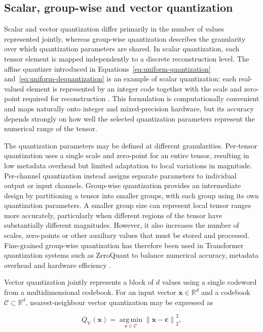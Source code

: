 \subsection{Scalar, group-wise and vector quantization}
Scalar and vector quantization differ primarily in the number of values
represented jointly, whereas group-wise quantization describes the
granularity over which quantization parameters are shared. In scalar
quantization, each tensor element is mapped independently to a discrete
reconstruction level. The affine quantizer introduced in
Equations~\eqref{eq:uniform-quantization}
and~\eqref{eq:uniform-dequantization} is an example of scalar
quantization: each real-valued element is represented by an integer code
together with the scale and zero-point required for reconstruction
\cite{jacob2017quantizationtrainingneuralnetworks}. This formulation is
computationally convenient and maps naturally onto integer and
mixed-precision hardware, but its accuracy depends strongly on how well
the selected quantization parameters represent the numerical range of
the tensor.

The quantization parameters may be defined at different granularities.
Per-tensor quantization uses a single scale and zero-point for an entire
tensor, resulting in low metadata overhead but limited adaptation to
local variations in magnitude. Per-channel quantization instead assigns
separate parameters to individual output or input channels. Group-wise
quantization provides an intermediate design by partitioning a tensor
into smaller groups, with each group using its own quantization
parameters. A smaller group size can represent local tensor ranges more
accurately, particularly when different regions of the tensor have
substantially different magnitudes. However, it also increases the
number of scales, zero-points or other auxiliary values that must be
stored and processed. Fine-grained group-wise quantization has therefore
been used in Transformer quantization systems such as ZeroQuant to
balance numerical accuracy, metadata overhead and hardware efficiency
\cite{yao2022zeroquantefficientaffordableposttraining}.

Vector quantization jointly represents a block of \(d\) values using a
single codeword from a multidimensional codebook. For an input vector
\(\mathbf{x}\in\mathbb{R}^{d}\) and a codebook
\(\mathcal{C}\subset\mathbb{R}^{d}\), nearest-neighbour vector
quantization may be expressed as

\begin{equation}
Q_{\mathrm{V}}(\mathbf{x})
=
\underset{\mathbf{c}\in\mathcal{C}}{\operatorname{arg\,min}}
\left\|
\mathbf{x}-\mathbf{c}
\right\|_{2}^{2},
\label{eq:vector-quantization}
\end{equation}

